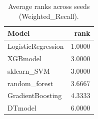 \begin{table}[t]
\centering
\begin{tabular}{lr}
\toprule
Model & rank \\
\midrule
LogisticRegression & 1.0000 \\
XGBmodel & 3.0000 \\
sklearn_SVM & 3.0000 \\
random_forest & 3.6667 \\
GradientBoosting & 4.3333 \\
DTmodel & 6.0000 \\
\bottomrule
\end{tabular}
\caption{Average ranks across seeds (Weighted_Recall).}
\label{tab:avg_rank_Weighted_Recall}
\end{table}